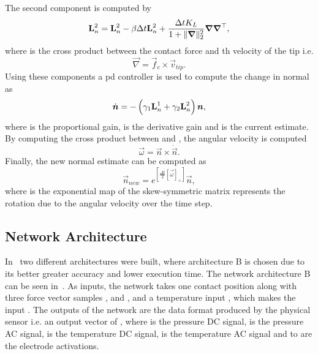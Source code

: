 The second component  is computed by
%
\begin{equation} \label{eq:def-L-2}
	\bm{\mathrm{L}}_n^2 = \bm{\mathrm{L}}_n^2 - \beta \Delta t \bm{\mathrm{L}}_n^2 + \frac{\Delta t K_L}{1+
	\|\bm{\nabla}\|_2^2} \bm{\nabla} \bm{\nabla}^\top,
\end{equation}
where  is the cross product between the contact force  and th velocity of the tip  i.e.
%
\begin{equation} \label{eq:def-nabla-rls}
	\vec{\nabla} = \vec{f}_c \times \vec{v}_{tip}.
\end{equation}
Using these components a \gls{pd} controller is used to compute the change in normal  as 
%
\begin{equation} \label{eq:def-n-dot}
	\dot{\bm{n}} = -\left( \gamma_1 \bm{\mathrm{L}}_n^1 + \gamma_2 \bm{\mathrm{L}}_n^2 \right)\bm{n},
\end{equation}
where  is the proportional gain,  is the derivative gain and  is the current estimate. By computing the cross product between  and , the angular velocity \mvar{\vec{\omega}} is computed
%
\begin{equation} \label{eq:omega-from-n-and-n-dot}
	\vec{\omega} = \vec{n} \times \dot{\vec{n}}.
\end{equation}
Finally, the new normal estimate  can be computed as
%
\begin{equation}
	\vec{n}_{new} = e^{ \left[ \frac{\Delta t }{2} [\vec{\omega}]_\times \right]} \vec{n},
\end{equation}
where  is the exponential map of the skew-symmetric matrix represents the rotation due to the angular velocity over the time step.

\subsection{Network Architecture}\label{sec:1-tactile-perception-method-network-architecture}
In~\cite{simulation-of-the-syntouch-biotac-sensor} two different architectures were built, where architecture B is chosen due to its better greater accuracy and lower execution time. The network architecture B can be seen in~. As inputs, the network takes one contact position  along with three force vector samples ,  and , and a temperature input , which makes the input . The outputs of the network are the data format produced by the physical sensor i.e. an output vector of , where  is the pressure DC signal,  is the pressure AC signal,  is the temperature DC signal,  is the temperature AC signal and  to  are the electrode activations.

